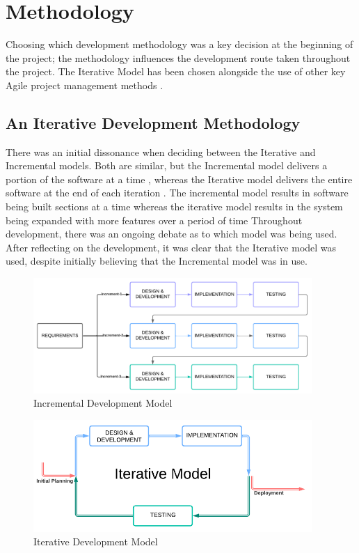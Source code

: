 \chapter{Methodology}
\label{chap:methodology}

Choosing which development methodology was a key decision at the beginning of the project; the methodology influences the development route taken throughout the project. The Iterative Model has been chosen alongside the use of other key Agile project management methods .

\section{An Iterative Development Methodology}
\label{methodology:chosen}

There was an initial dissonance when deciding between the Iterative and Incremental models. Both are similar, but the Incremental model delivers a portion of the software at a time , whereas the Iterative model delivers the entire software at the end of each iteration . The incremental model results in software being built sections at a time  whereas the iterative model results in the system being expanded with more features over a period of time  Throughout development, there was an ongoing debate as to which model was being used. After reflecting on the development, it was clear that the Iterative model was used, despite initially believing that the Incremental model was in use. 

\begin{figure}
    \centering
    \includegraphics[width=400px]{figures/incremental-model.pdf}
    \caption{Incremental Development Model}
    \label{fig:incremental}
\end{figure}

\begin{figure}
    \centering
    \includegraphics[width=400px]{figures/iterative-model.pdf}
    \caption{Iterative Development Model}
    \label{fig:iterative}
\end{figure}

